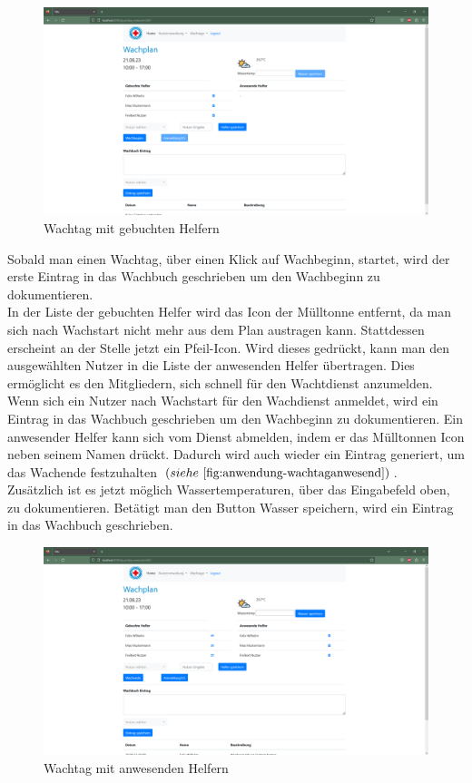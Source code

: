 \documentclass[fontsize=12pt,openright,oneside,paper=a4,BCOR=1cm]{scrbook}
\begin{document}
\begin{figure}[H]
  \centering
    \includegraphics[width=0.8\linewidth]{Anlagen/Anwendung/8-1WachtagNutzerGebucht.png}
    \caption{Wachtag mit gebuchten Helfern}
  \label{fig:anwendung-wachtaggebucht}
\end{figure}

Sobald man einen Wachtag, \"uber einen Klick auf \glqq Wachbeginn\grqq{}, startet, wird der erste Eintrag in das Wachbuch geschrieben um den Wachbeginn zu dokumentieren. \\
In der Liste der gebuchten Helfer wird das Icon der M\"ulltonne entfernt, da man sich nach Wachstart nicht mehr aus dem Plan austragen kann. Stattdessen erscheint an der Stelle jetzt ein Pfeil-Icon. Wird dieses gedr\"uckt, kann man den ausgew\"ahlten Nutzer in die Liste der anwesenden Helfer \"ubertragen. Dies erm\"oglicht es den Mitgliedern, sich schnell f\"ur den Wachtdienst anzumelden. \\
Wenn sich ein Nutzer nach Wachstart f\"ur den Wachdienst anmeldet, wird ein Eintrag in das Wachbuch geschrieben um den Wachbeginn zu dokumentieren. Ein anwesender Helfer kann sich vom Dienst abmelden, indem er das M\"ulltonnen Icon neben seinem Namen dr\"uckt. Dadurch wird auch wieder ein Eintrag generiert, um das Wachende festzuhalten $(siehe~\ref{fig:anwendung-wachtaganwesend})$. \\
Zus\"atzlich ist es jetzt m\"oglich Wassertemperaturen, \"uber das Eingabefeld oben, zu dokumentieren. Bet\"atigt man den Button \glqq Wasser speichern\grqq{}, wird ein Eintrag in das Wachbuch geschrieben. \\

\begin{figure}[H]
  \centering
    \includegraphics[width=0.8\linewidth]{Anlagen/Anwendung/8-3WachtagAnwesendeNutzer.png}
    \caption{Wachtag mit anwesenden Helfern}
  \label{fig:anwendung-wachtaganwesend}
\end{figure}
\end{document}
